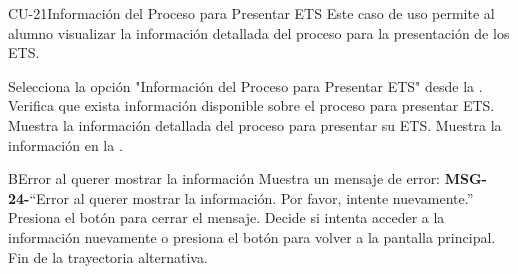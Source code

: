 
\begin{UseCase}{CU-21}{Información del Proceso para Presentar ETS}{
		Este caso de uso permite al alumno visualizar la información detallada del proceso para la presentación de los ETS.
	}
\end{UseCase}
\begin{UCtrayectoria}
	\UCpaso[\UCactor] Selecciona la opción "Información del Proceso para Presentar ETS" desde la .
	\UCpaso Verifica que exista información disponible sobre el proceso para presentar ETS. 
	\UCpaso Muestra la información detallada del proceso para presentar su ETS.
	\UCpaso[\UCsist] Muestra la información en la .
\end{UCtrayectoria}
\begin{UCtrayectoriaA}{B}{Error al querer mostrar la información}
	\UCpaso Muestra un mensaje de error: {\bf MSG-24-}{``Error al querer mostrar la información. Por favor, intente nuevamente.''}
	\UCpaso[\UCactor] Presiona el botón  para cerrar el mensaje.
	\UCpaso[\UCactor] Decide si intenta acceder a la información nuevamente o presiona el botón  para volver a la pantalla principal.
	\UCpaso Fin de la trayectoria alternativa.
\end{UCtrayectoriaA}


